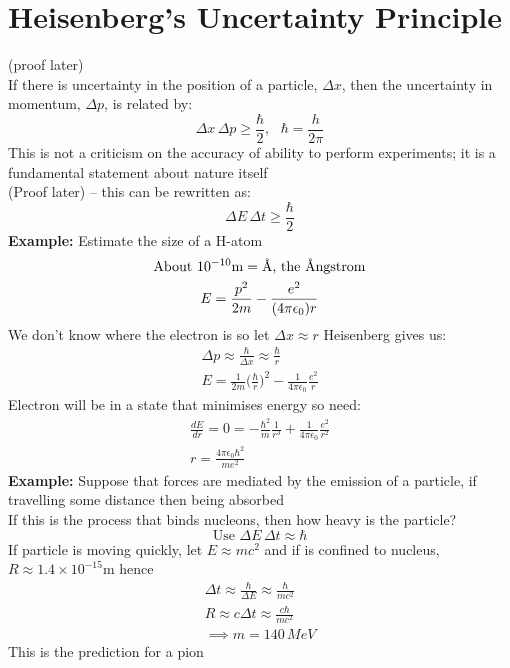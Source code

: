 \documentclass[a4paper, 11pt, fleqn, normalem]{report}
\begin{document}
\section{Heisenberg's Uncertainty Principle}
(proof later) \\
If there is uncertainty in the position of a particle, $\Delta x$, then the uncertainty in momentum, $\Delta p$, is related by:
\begin{equation*}
    \Delta x\,\Delta p \geq \frac{\hbar}{2},~~~\hbar = \frac{h}{2\pi}
\end{equation*}
This is not a criticism on the accuracy of ability to perform experiments; it is a fundamental statement about nature itself \\
(Proof later) -- this can be rewritten as:
\begin{equation*}
    \Delta E\,\Delta t \geq \frac{\hbar}{2}
\end{equation*}
\textbf{Example: }Estimate the size of a H-atom
\begin{gather*}
    \text{About }10^{-10}\text{m} = \text{\r{A}, the \r{A}ngstrom} \\
    E = \frac{p^{2}}{2m} - \frac{e^{2}}{(4\pi\epsilon_{0})r}
\end{gather*}
We don't know where the electron is so let $\Delta x \approx r$
Heisenberg gives us:
\begin{gather*}
    \Delta p \approx \frac{\hbar}{\Delta x} \approx \frac{\hbar}{r} \\
    E = \frac{1}{2m}\Big(\frac{\hbar}{r}\Big)^{2} - \frac{1}{4\pi\epsilon_{0}}\frac{e^{2}}{r}
\end{gather*}
Electron will be in a state that minimises energy so need:
\begin{gather*}
    \frac{dE}{dr} = 0 = -\frac{\hbar^{2}}{m}\frac{1}{r^{3}} + \frac{1}{4\pi\epsilon_{0}}\frac{e^{2}}{r^{2}} \\
    r = \frac{4\pi\epsilon_{0}\hbar^{2}}{me^{2}}
\end{gather*}
\textbf{Example: }Suppose that forces are mediated by the emission of a particle, if travelling some distance then being absorbed \\
If this is the process that binds nucleons, then how heavy is the particle?
\begin{equation*}
    \text{Use }\Delta E\,\Delta t \approx \hbar
\end{equation*}
If particle is moving quickly, let $E \approx mc^{2}$ and if is confined to nucleus, $R \approx 1.4\times10^{-15}$m hence
\begin{gather*}
    \Delta t \approx \frac{\hbar}{\Delta E} \approx \frac{\hbar}{mc^{2}} \\
    R \approx c\Delta t \approx \frac{c\hbar}{mc^{2}} \\
    \implies m = 140\,MeV
\end{gather*}
This is the prediction for a pion
\end{document}
